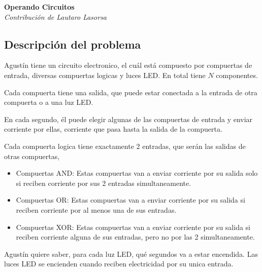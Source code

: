 \documentclass[fontsize=13pt, paper=a4, DIV=calc]{scrartcl}
\renewcommand*{\maketitle}{
	\begin{center}
		\textbf{\nombre}\\
		\textit{\footnotesize Contribución de \author}
	\end{center}
}
\begin{document}
\def\contest{OIA Certamen Nacional}
\def\nombre{Operando Circuitos}
\def\author{Lautaro Lasorsa}
\def\niveldia{}
\def\numero{}
\def\archivo{circuitos}%
\def\version{}


\maketitle
\begin{multicols*}{2}

\section{Descripción del problema}

Agustín tiene un circuito electronico, el cuál está compuesto por compuertas de entrada, diversas compuertas logicas y luces LED. En total tiene $N$ componentes.

Cada compuerta tiene una salida, que puede estar conectada a la entrada de otra compuerta o a una luz LED.

En cada segundo, él puede elegir algunas de las compuertas de entrada y enviar corriente por ellas, corriente que pasa hasta la salida de la compuerta.

Cada compuerta logica tiene exactamente 2 entradas, que serán las salidas de otras compuertas,

\begin{itemize}
    \item Compuertas AND: Estas compuertas van a enviar corriente por su salida solo si reciben corriente por sus 2 entradas simultaneamente.
    \item Compuertas OR: Estas compuertas van a enviar corriente por su salida si reciben corriente por al menos una de sus entradas.
    \item Compuertas XOR: Estas compuertas van a enviar corriente por su salida si reciben corriente alguna de sus entradas, pero no por las 2 simultaneamente.
\end{itemize}

Agustín quiere saber, para cada luz LED, qué segundos va a estar encendida. Las luces LED se encienden cuando reciben electricidad por su unica entrada.


\end{multicols*}
\end{document}
